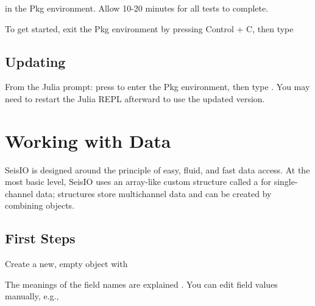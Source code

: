 \documentclass[letterpaper,11pt,english]{sphinxmanual}
\begin{document}
\begin{sphinxVerbatim}[commandchars=\\\{\}]
 
\end{sphinxVerbatim}

in the Pkg environment. Allow 10-20 minutes for all tests to complete.

To get started, exit the Pkg environment by pressing Control + C, then type

\begin{sphinxVerbatim}[commandchars=\\\{\}]
 
\end{sphinxVerbatim}


\subsection{Updating}
\label{\detokenize{src/intro:updating}}
From the Julia prompt: press \sphinxcode{\sphinxupquote{{]}}} to enter the Pkg environment, then type . You may need to restart the Julia REPL afterward to use the updated version.


\section{Working with Data}
\label{\detokenize{src/working_with_data:working-with-data}}\label{\detokenize{src/working_with_data::doc}}
SeisIO is designed around the principle of easy, fluid, and fast data access.
At the most basic level, SeisIO uses an array-like custom structure called a
 for single-channel data;  structures store
multichannel data and can be created by combining  objects.


\subsection{First Steps}
\label{\detokenize{src/working_with_data:first-steps}}
Create a new, empty  object with


\begin{fulllineitems}
\end{fulllineitems}


The meanings of the field names are explained . You can edit
field values manually, e.g.,
\end{document}
